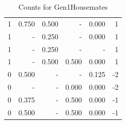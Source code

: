 \documentclass[a4paper]{article}\usepackage{graphicx, color}
\begin{document}
\begin{table}[ht]
\begin{tabular}{rrrrrr}
  1 & 0.750 & 0.500 & - & 0.000 & 1 \\ 
  1 & - & 0.250 & - & 0.000 & 1 \\ 
  1 & - & 0.250 & - & - & 1 \\ 
   \rowcolor{goodColor} 1 & - & 0.500 & 0.500 & 0.000 & 1 \\ 
   \rowcolor{nullColor} 0 & 0.500 & - & - & 0.125 & -2 \\ 
   \rowcolor{sosoColor} 0 & - & - & 0.000 & 0.000 & -2 \\ 
   \rowcolor{sosoColor} 0 & 0.375 & - & 0.500 & 0.000 & -1 \\ 
   \rowcolor{sosoColor} 0 & 0.500 & - & 0.500 & 0.000 & -1 \\ 
   \hline
\end{tabular}
\caption{Counts for Gen1Housemates} 
\end{table}
\end{document}
